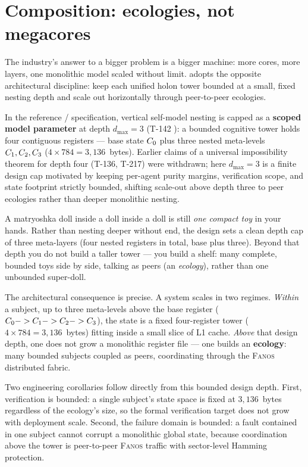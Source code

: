 \section{Composition: ecologies, not megacores}
\label{sec:composition}

The industry's answer to a bigger problem is a bigger machine: more cores,
more layers, one monolithic model scaled without limit. \TALOS{} adopts the
opposite architectural discipline: keep each unified holon tower bounded at a
small, fixed nesting depth and scale out horizontally through peer-to-peer
ecologies.

\begin{claimbox}
In the reference \TALOS{}/\SYNARC{} specification, vertical self-model nesting
is capped as a \textbf{scoped model parameter} at depth $d_{\max}=3$ (T-142
): a bounded cognitive tower holds four contiguous \DM{} registers
--- base state $C_0$ plus three nested meta-levels $C_1,C_2,C_3$
($4\times 784=3{,}136$~bytes). Earlier claims of a universal impossibility
theorem for depth four (T-136, T-217) were withdrawn; here $d_{\max}=3$ is a
finite design cap motivated by keeping per-agent purity margins, verification
scope, and state footprint strictly bounded, shifting scale-out above depth
three to peer ecologies rather than deeper monolithic nesting.
\end{claimbox}

\begin{zerobox}
A matryoshka doll inside a doll inside a doll is still \emph{one compact toy}
in your hands. Rather than nesting deeper without end, the design sets a clean
depth cap of three meta-layers (four nested registers in total, base plus
three). Beyond that depth you do not build a taller tower --- you build a
shelf: many complete, bounded toys side by side, talking as peers (an
\emph{ecology}), rather than one unbounded super-doll.
\end{zerobox}

The architectural consequence is precise. A \TALOS{} system scales in two
regimes. \emph{Within} a subject, up to three meta-levels above the base
register ($C_0->C_1->C_2->C_3$), the state is a fixed four-register
tower ($4\times784=3{,}136$~bytes) fitting inside a small slice of L1 cache.
\emph{Above} that design depth, one does not grow a monolithic register file
--- one builds an \textbf{ecology}: many bounded subjects coupled as peers,
coordinating through the \textsc{Fanos} distributed fabric.

Two engineering corollaries follow directly from this bounded design depth.
First, verification is bounded: a single subject's state space is fixed at
$3{,}136$~bytes regardless of the ecology's size, so the formal verification
target does not grow with deployment scale. Second, the failure domain is
bounded: a fault contained in one subject cannot corrupt a monolithic global
state, because coordination above the tower is peer-to-peer \textsc{Fanos}
traffic with sector-level Hamming protection.
